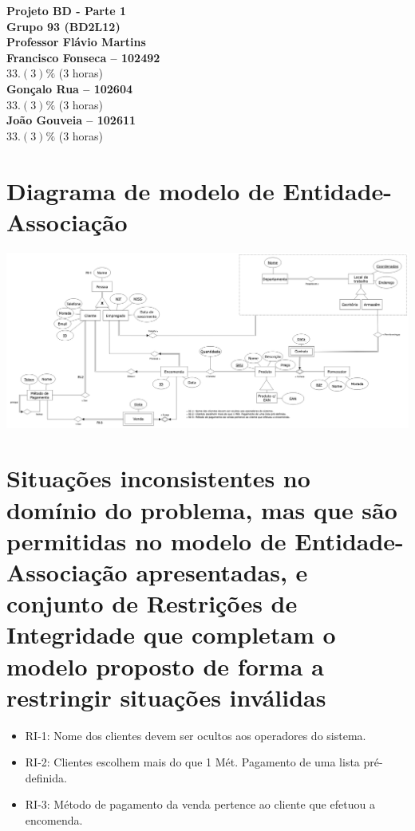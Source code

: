 \documentclass{article}
\begin{document}
\begin{titlepage}

    \begin{center}
        {\Huge\bfseries Projeto BD - Parte 1\\}
        \vspace{1cm}
        {\Large\bfseries Grupo 93 (BD2L12)}\\
        \vspace{0.1cm}
        {\Large\bfseries Professor Flávio Martins}\\
        \vspace{0.5cm}
        {\Large\bfseries Francisco Fonseca -- 102492}\\[5pt]
        $33.(3)\%$ (3 horas)\\[14pt]
        {\Large\bfseries Gonçalo Rua -- 102604}\\[5pt]
        $33.(3)\%$ (3 horas)\\[14pt]
        {\Large\bfseries João Gouveia -- 102611}\\[5pt]
        $33.(3)\%$ (3 horas)\\[14pt]
    \end{center}

\end{titlepage}

\section{Diagrama de modelo de Entidade-Associação}

\vspace{0.5cm}
\includegraphics[scale=0.2]{diagrama.png}
\vspace{0.5cm}

\section{Situações inconsistentes no domínio do problema, mas que são permitidas no modelo de Entidade-Associação apresentadas, e conjunto de Restrições de Integridade que completam o modelo proposto de forma a restringir situações inválidas}

\begin{itemize}
    \item RI-1: Nome dos clientes devem ser ocultos aos operadores do sistema.
    \item RI-2: Clientes escolhem mais do que 1 Mét. Pagamento de uma lista pré-definida.
    \item RI-3: Método de pagamento da venda pertence ao cliente que efetuou a encomenda.
\end{itemize}
\end{document}

